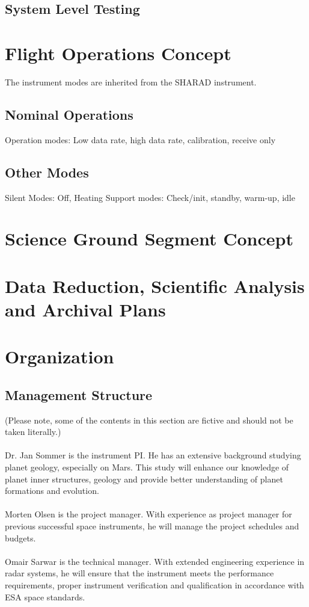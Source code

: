 \subsection{System Level Testing}
%
\section{Flight Operations Concept}
%
The instrument modes are inherited from the SHARAD instrument\cite{SHARAD_ppt}.
%
\subsection{Nominal Operations}
%
Operation modes: Low data rate, high data rate, calibration, receive only
%
\subsection{Other Modes}
%
Silent Modes: Off, Heating
Support modes: Check/init, standby, warm-up, idle
%
%
%
\section{Science Ground Segment Concept}
%
\section{Data Reduction, Scientific Analysis and Archival Plans}
%
\section{Organization}
\subsection{Management Structure}
(Please note, some of the contents in this section are fictive and should not be taken literally.)\\\\
%
\noindent
Dr. Jan Sommer is the instrument \ac{PI}. He has an extensive background studying planet geology, especially on Mars. This study will enhance our knowledge of planet inner structures, geology and provide better understanding of planet formations and evolution.\\\\
%
\noindent
Morten Olsen is the project manager. With experience as project manager for previous successful space instruments, he will manage the project schedules and budgets.\\\\
%
\noindent
Omair Sarwar is the technical manager. With extended engineering experience in radar systems, he will ensure that the instrument meets the performance requirements, proper instrument verification and qualification in accordance with ESA space standards.\\\\
%
